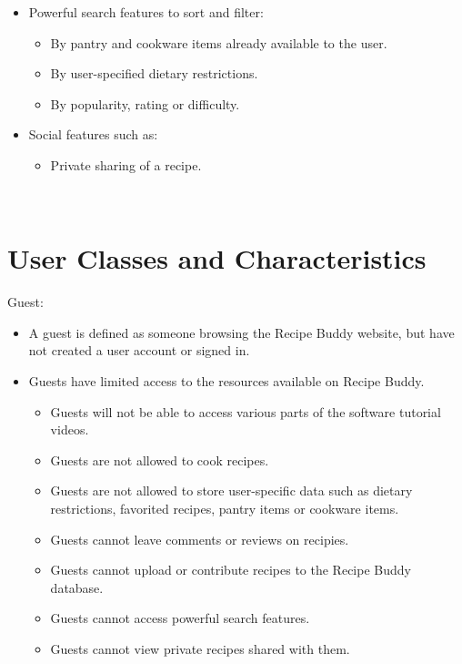\documentclass{scrreprt}
\begin{document}
\begin{itemize}
\begin{itemize}
          \end{itemize}
    \item Powerful search features to sort and filter:
          \begin{itemize}
              \item By pantry and cookware items already available to the user.
              \item By user-specified dietary restrictions.
              \item By popularity, rating or difficulty.
          \end{itemize}
    \item Social features such as:
          \begin{itemize}
              \item Private sharing of a recipe.
          \end{itemize}
\end{itemize}
$ $

\section{User Classes and Characteristics}
Guest:
\begin{itemize}
    \item A guest is defined as someone browsing the \gls{Recipe Buddy} website, but have not created a user account or signed in.
    \item Guests have limited access to the resources available on \gls{Recipe Buddy}.
          \begin{itemize}
              \item Guests will not be able to access various parts of the software tutorial videos.
              \item Guests are not allowed to cook recipes.
              \item Guests are not allowed to store user-specific data such as dietary restrictions, favorited recipes, pantry items or cookware items.
              \item Guests cannot leave comments or reviews on recipies.
              \item Guests cannot upload or contribute recipes to the \gls{Recipe Buddy} database.
              \item Guests cannot access powerful search features.
              \item Guests cannot view private recipes shared with them.
          \end{itemize}
\end{itemize}
\end{document}
